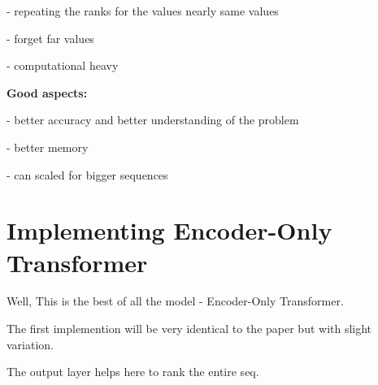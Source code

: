 \documentclass[journal,12pt,onecolumn]{IEEEtran}
\begin{document}
- repeating the ranks for the values nearly same values

- forget far values

- computational heavy


\textbf{Good aspects:}

- better accuracy and better understanding of the problem 

- better memory

- can scaled for bigger sequences

\section{Implementing Encoder-Only Transformer}
Well, This is the best of all the model - Encoder-Only Transformer.

The first implemention will be very identical to the paper but with slight variation.

The output layer helps here to rank the entire seq.
\end{document}
